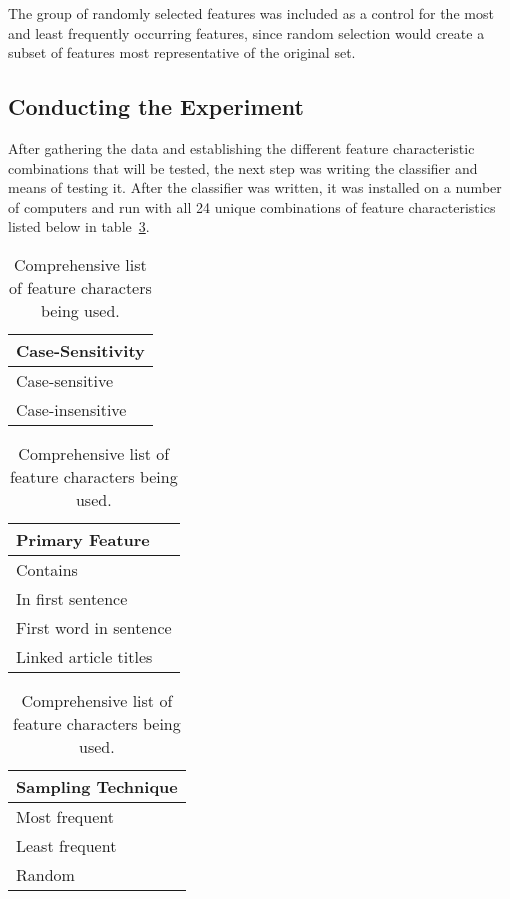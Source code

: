 The group of randomly selected features was included as a control for the most and least frequently occurring features, since random selection would create a subset of features most representative of the original set.

\subsection{Conducting the Experiment}

After gathering the data and establishing the different feature characteristic combinations that will be tested, the next step was writing the classifier and means of testing it.
After the classifier was written, it was installed on a number of computers and run with all 24 unique combinations of feature characteristics listed below in table~\ref{tab:feature-characteristics}. 

\begin{center}
\begin{table}[H]
\begin{minipage}[t]{.33\linewidth}
\vspace{0pt}
\centering
\begin{tabular}{l}
\textbf{Case-Sensitivity} \\
\hline
Case-sensitive \\
Case-insensitive \\
\end{tabular}
\end{minipage}\hfill
\begin{minipage}[t]{.33\linewidth}
\vspace{0pt}
\centering
\begin{tabular}{l}
\textbf{Primary Feature} \\
\hline
Contains \\
In first sentence \\
First word in sentence \\
Linked article titles \\
\end{tabular}
\end{minipage}\hfill
\begin{minipage}[t]{.33\linewidth}
\vspace{0pt}
\centering
\begin{tabular}{l}
\textbf{Sampling Technique} \\
\hline
Most frequent \\
Least frequent \\
Random \\
\end{tabular}
\end{minipage}
\caption{Comprehensive list of feature characters being used.\label{tab:feature-characteristics}}
\end{table}
\end{center}

